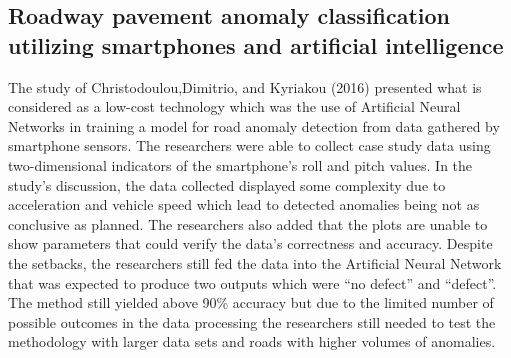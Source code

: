 \documentclass{report} %
\begin{document}
	\subsection{Roadway pavement anomaly classification utilizing smartphones and artificial intelligence}
		The study of Christodoulou,Dimitrio, and Kyriakou (2016) presented what is considered as a low-cost technology which was the use of Artificial Neural Networks in training a model for road anomaly detection from data gathered by smartphone sensors. The researchers were able to collect case study data using two-dimensional indicators of the smartphone’s roll and pitch values. In the study’s discussion, the data collected displayed some complexity due to acceleration and vehicle speed which lead to detected anomalies being not as conclusive as planned. The researchers also added that the plots are unable to show parameters that could verify the data’s correctness and accuracy. Despite the setbacks, the researchers still fed the data into the Artificial Neural Network that was expected to produce two outputs which were “no defect” and “defect”. The method still yielded above 90\% accuracy but due to the limited number of possible outcomes in the data processing the researchers still needed to test the methodology with larger data sets and roads with higher volumes of anomalies.
		
	
	
\end{document}
